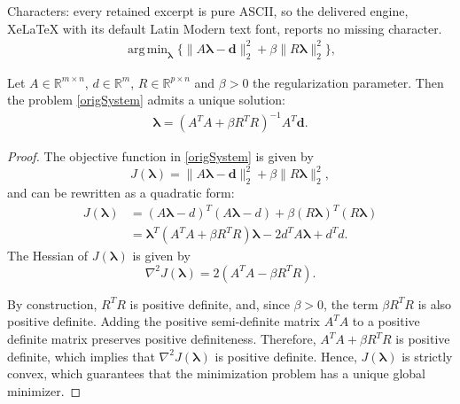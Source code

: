 \documentclass[10pt,a4paper]{amsart}
\DeclareMathOperator*{\argmin}{arg\,min}
\def\bd{\boldsymbol{d}}
\def\blambda{\boldsymbol{\lambda}}
\begin{document}
Characters: every retained excerpt is pure ASCII, so the delivered engine, XeLaTeX with its default Latin Modern text font, reports no missing character.
\begin{align}\label{origSystem}
    \argmin_{\blambda} \{ \|A\blambda - \bd \|_2^2 + \beta \| R \blambda \|_2^2\}, 
\end{align}

\begin{theorem}
Let $A\in \mathbb{R}^{m\times n}$, $d\in \mathbb{R}^m$, $R\in \mathbb{R}^{p\times n}$ and  $\beta>0$ the regularization parameter. Then the problem \eqref{origSystem} admits a unique solution:
        \begin{align}\label{uniqueSol}
\blambda= (A^T A + \beta R^T R )^{-1} A^T\bd.
\end{align}
\end{theorem}

\begin{proof}
    The objective function in \eqref{origSystem} is given by
    \begin{equation}
         J(\blambda)=\|A\blambda - \bd \|_2^2 + \beta \| R \blambda \|_2^2, 
    \end{equation}
    and can be rewritten as a quadratic form:
\begin{align}
    J(\blambda)&=(A\blambda-d)^T(A\blambda-d) + \beta(R\blambda)^T(R\blambda)\\
    &=\blambda^T(A^TA+\beta R^TR)\blambda - 2d^TA\blambda+d^Td.
\end{align}
The Hessian of $J(\blambda)$ is given by
\begin{equation*}
    \nabla^2J(\blambda)=2(A^TA-\beta R^TR).
\end{equation*}

By construction, $R^TR$ is positive definite, and, since $\beta>0$, the term $\beta R^TR$ is also positive definite. 
Adding the positive semi-definite matrix $A^TA$ to a positive definite matrix preserves positive definiteness. Therefore, $A^TA+\beta R^TR$ is positive definite, which implies that $\nabla^2J(\blambda)$ is positive definite. 
Hence, $J(\blambda)$ is strictly convex, which guarantees that the minimization problem has a unique global minimizer. 
\end{proof}
\end{document}
